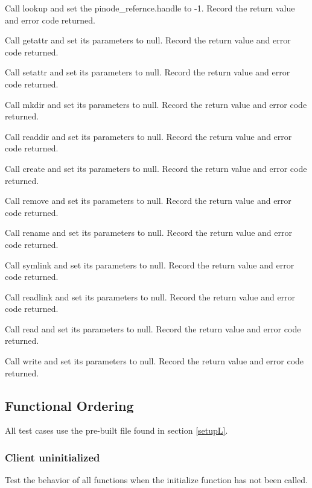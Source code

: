 \documentclass[12pt]{article} %
\begin{document}
\begin{list}{.}{}
\item Call lookup and set the pinode\_refernce.handle to -1.  Record the return value and error code returned.
\item Call getattr and set its parameters to null.  Record the return value and error code returned.
\item Call setattr and set its parameters to null.  Record the return value and error code returned.
\item Call mkdir and set its parameters to null.  Record the return value and error code returned.
\item Call readdir and set its parameters to null.  Record the return value and error code returned.
\item Call create and set its parameters to null.  Record the return value and error code returned.
\item Call remove and set its parameters to null.  Record the return value and error code returned.
\item Call rename and set its parameters to null.  Record the return value and error code returned.
\item Call symlink and set its parameters to null.  Record the return value and error code returned.
\item Call readlink and set its parameters to null.  Record the return value and error code returned.
\item Call read and set its parameters to null.  Record the return value and error code returned.
\item Call write and set its parameters to null.  Record the return value and error code returned.
\end{list}

\subsection{Functional Ordering}
All test cases use the pre-built file found in section \ref{setupL}.

\subsubsection{Client uninitialized}
Test the behavior of all functions when the initialize function has not been called.
\end{document}
